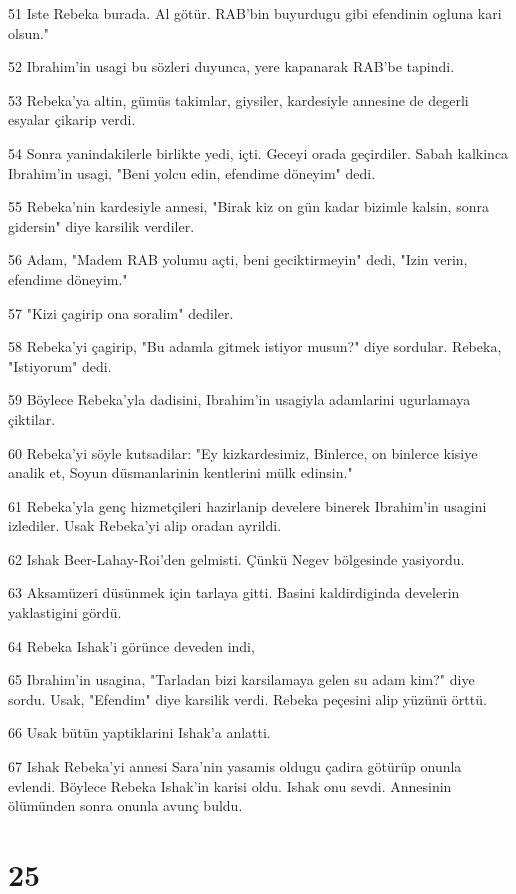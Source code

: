 \par 51 Iste Rebeka burada. Al götür. RAB'bin buyurdugu gibi efendinin ogluna kari olsun."
\par 52 Ibrahim'in usagi bu sözleri duyunca, yere kapanarak RAB'be tapindi.
\par 53 Rebeka'ya altin, gümüs takimlar, giysiler, kardesiyle annesine de degerli esyalar çikarip verdi.
\par 54 Sonra yanindakilerle birlikte yedi, içti. Geceyi orada geçirdiler. Sabah kalkinca Ibrahim'in usagi, "Beni yolcu edin, efendime döneyim" dedi.
\par 55 Rebeka'nin kardesiyle annesi, "Birak kiz on gün kadar bizimle kalsin, sonra gidersin" diye karsilik verdiler.
\par 56 Adam, "Madem RAB yolumu açti, beni geciktirmeyin" dedi, "Izin verin, efendime döneyim."
\par 57 "Kizi çagirip ona soralim" dediler.
\par 58 Rebeka'yi çagirip, "Bu adamla gitmek istiyor musun?" diye sordular. Rebeka, "Istiyorum" dedi.
\par 59 Böylece Rebeka'yla dadisini, Ibrahim'in usagiyla adamlarini ugurlamaya çiktilar.
\par 60 Rebeka'yi söyle kutsadilar: "Ey kizkardesimiz, Binlerce, on binlerce kisiye analik et, Soyun düsmanlarinin kentlerini mülk edinsin."
\par 61 Rebeka'yla genç hizmetçileri hazirlanip develere binerek Ibrahim'in usagini izlediler. Usak Rebeka'yi alip oradan ayrildi.
\par 62 Ishak Beer-Lahay-Roi'den gelmisti. Çünkü Negev bölgesinde yasiyordu.
\par 63 Aksamüzeri düsünmek için tarlaya gitti. Basini kaldirdiginda develerin yaklastigini gördü.
\par 64 Rebeka Ishak'i görünce deveden indi,
\par 65 Ibrahim'in usagina, "Tarladan bizi karsilamaya gelen su adam kim?" diye sordu. Usak, "Efendim" diye karsilik verdi. Rebeka peçesini alip yüzünü örttü.
\par 66 Usak bütün yaptiklarini Ishak'a anlatti.
\par 67 Ishak Rebeka'yi annesi Sara'nin yasamis oldugu çadira götürüp onunla evlendi. Böylece Rebeka Ishak'in karisi oldu. Ishak onu sevdi. Annesinin ölümünden sonra onunla avunç buldu.

\chapter{25}

